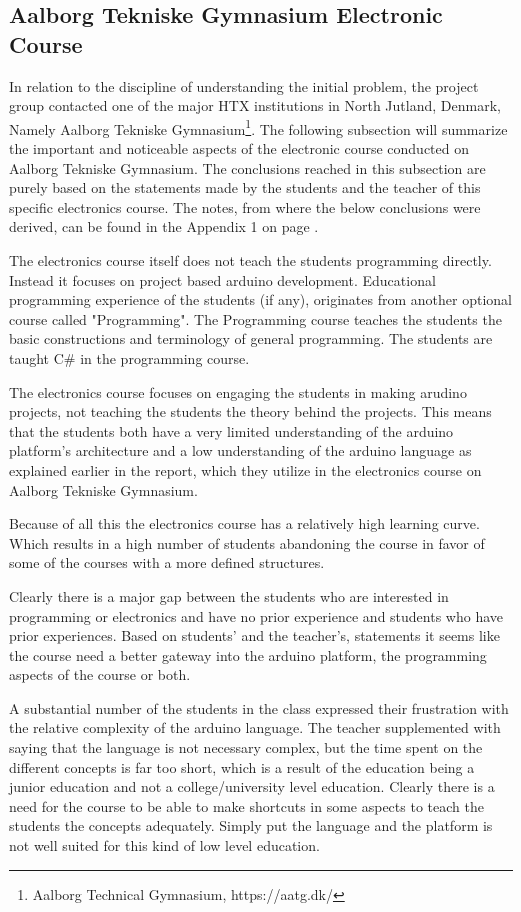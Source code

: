 \subsection{Aalborg Tekniske Gymnasium Electronic Course}
In relation to the discipline of understanding the initial problem, the project group contacted one of the major HTX institutions in North Jutland, Denmark, Namely Aalborg Tekniske Gymnasium\footnote{Aalborg Technical Gymnasium, https://aatg.dk/}. 
The following subsection will summarize the important and noticeable aspects of the electronic course conducted on Aalborg Tekniske Gymnasium. 
The conclusions reached in this subsection are purely based on the statements made by the students and the teacher of this specific electronics course.
The notes, from where the below conclusions were derived, can be found in the Appendix 1 on page \pageref{Interviews}.

The electronics course itself does not teach the students programming directly. 
Instead it focuses on project based arduino development. 
Educational programming experience of the students (if any), originates from another optional course called "Programming". 
The Programming course teaches the students the basic constructions and terminology of general programming. 
The students are taught C{\#} in the programming course. 

The electronics course focuses on engaging the students in making arudino projects, not teaching the students the theory behind the projects. 
This means that the students both have a very limited understanding of the arduino platform's architecture and a low understanding of the arduino language as explained earlier in the report, which they utilize in the electronics course on Aalborg Tekniske Gymnasium.

Because of all this the electronics course has a relatively high learning curve. 
Which results in a high number of students abandoning the course in favor of some of the courses with a more defined structures.

Clearly there is a major gap between the students who are interested in programming or electronics and have no prior experience and students who have prior experiences. 
Based on students' and the teacher's, statements it seems like the course need a better gateway into the arduino platform, the programming aspects of the course or both.

A substantial number of the students in the class expressed their frustration with the relative complexity of the arduino language. 
The teacher supplemented with saying that the language is not necessary complex, but the time spent on the different concepts is far too short, which is a result of the education being a junior education and not a college/university level education.
Clearly there is a need for the course to be able to make shortcuts in some aspects to teach the students the concepts adequately. 
Simply put the language and the platform is not well suited for this kind of low level education.

